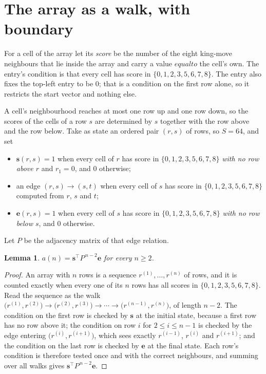 \documentclass[11pt,a4paper]{article}
\theoremstyle{plain}
\newtheorem{lemma}[theorem]{Lemma}
\theoremstyle{definition}
\begin{document}
\section{The array as a walk, with boundary}

For a cell of the array let its \emph{score} be the number of the eight king-move neighbours that lie inside
the array and carry a value $equal to$ the cell's own. The entry's condition is that every cell
has score in $\{0,1,2,3,5,6,7,8\}$. The entry also fixes the top-left entry to be $0$; that is a condition on the first row alone, so it restricts the start vector and nothing else.

A cell's neighbourhood reaches at most one row up and one row down, so the scores of the
cells of a row $s$ are determined by $s$ together with the row above and the row below.
Take as state an ordered pair $(r,s)$ of rows, so $S=64$, and set
\begin{itemize}
\item $\mathbf{s}(r,s)=1$ when every cell of $r$ has score in $\{0,1,2,3,5,6,7,8\}$ \emph{with no row
above $r$} and $r_1=0$, and $0$ otherwise;
\item an edge $(r,s)\to(s,t)$ when every cell of $s$ has score in $\{0,1,2,3,5,6,7,8\}$ computed from
$r$, $s$ and $t$;
\item $\mathbf{e}(r,s)=1$ when every cell of $s$ has score in $\{0,1,2,3,5,6,7,8\}$ \emph{with no row
below $s$}, and $0$ otherwise.
\end{itemize}
Let $P$ be the adjacency matrix of that edge relation.

\begin{lemma}\label{lem:walk}
$a(n)=\mathbf{s}^{\!\top}P^{\,n-2}\mathbf{e}$ for every $n\ge2$.
\end{lemma}

\begin{proof}
An array with $n$ rows is a sequence $r^{(1)},\dots,r^{(n)}$ of rows, and it is counted
exactly when every one of its $n$ rows has all scores in $\{0,1,2,3,5,6,7,8\}$. Read the sequence as the
walk $\bigl(r^{(1)},r^{(2)}\bigr)\to\bigl(r^{(2)},r^{(3)}\bigr)\to\cdots\to
\bigl(r^{(n-1)},r^{(n)}\bigr)$, of length $n-2$. The condition on the first row is
checked by $\mathbf{s}$ at the initial state, because a first row has no row above it; the
condition on row $i$ for $2\le i\le n-1$ is checked by the edge entering
$\bigl(r^{(i)},r^{(i+1)}\bigr)$, which sees exactly $r^{(i-1)}$, $r^{(i)}$ and
$r^{(i+1)}$; and the condition on the last row is checked by $\mathbf{e}$ at the final
state. Each row's condition is therefore tested once and with the correct neighbours, and
summing over all walks gives $\mathbf{s}^{\!\top}P^{\,n-2}\mathbf{e}$.
\end{proof}
\end{document}
